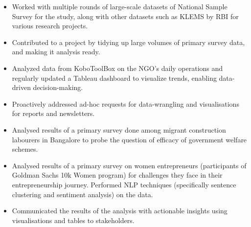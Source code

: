 \documentclass[9pt,a4paper]{altacv}
\begin{document}
\newpage
{}
\begin{itemize}
    \item Worked with multiple rounds of large-scale datasets of National Sample Survey for the study, along with other datasets such as KLEMS by RBI for various research projects.
    \item Contributed to a project by tidying up large volumes of primary survey data, and making it analysis ready.
\end{itemize}

\begin{itemize}
    \item Analyzed data from KoboToolBox on the NGO's daily operations and regularly updated a Tableau dashboard to visualize trends, enabling data-driven decision-making.
    \item Proactively addressed ad-hoc requests for data-wrangling and visualisations for reports and newsletters.
\end{itemize}
\divider
{}
\begin{itemize}
    \item Analysed results of a primary survey done among migrant construction labourers in Bangalore to probe the question of efficacy of government welfare schemes.
\end{itemize}
\divider
{}
\begin{itemize}
    \item Analysed results of a primary survey on women entrepreneurs (participants of Goldman Sachs 10k Women program) for challenges they face in their entrepreneurship journey. Performed NLP techniques (specifically sentence clustering and sentiment analysis) on the data. 
    \item Communicated the results of the analysis with actionable insights using visualisations and tables to stakeholders.
\end{itemize}
\divider
\end{document}
